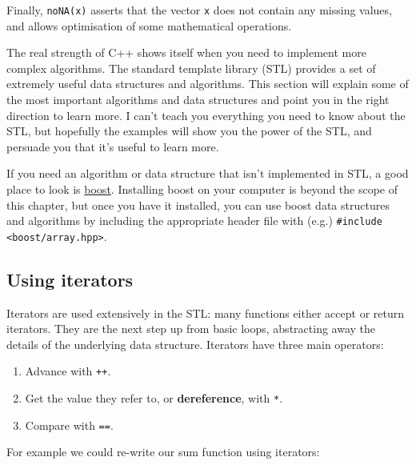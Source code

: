 Finally, \texttt{noNA(x)} asserts that the vector \texttt{x} does not
contain any missing values, and allows optimisation of some mathematical
operations.


The real strength of C++ shows itself when you need to implement more
complex algorithms. The standard template library (STL) provides a set
of extremely useful data structures and algorithms. This section will
explain some of the most important algorithms and data structures and
point you in the right direction to learn more. I can't teach you
everything you need to know about the STL, but hopefully the examples
will show you the power of the STL, and persuade you that it's useful to
learn more. 

If you need an algorithm or data structure that isn't implemented in
STL, a good place to look is \href{http://www.boost.org/doc/}{boost}.
Installing boost on your computer is beyond the scope of this chapter,
but once you have it installed, you can use boost data structures and
algorithms by including the appropriate header file with (e.g.)
\texttt{\#include \textless{}boost/array.hpp\textgreater{}}.

\subsection{Using iterators}

Iterators are used extensively in the STL: many functions either accept
or return iterators. They are the next step up from basic loops,
abstracting away the details of the underlying data structure. Iterators
have three main operators: 

\begin{enumerate}
\def\labelenumi{\arabic{enumi}.}
\itemsep1pt\parskip0pt
\item
  Advance with \texttt{++}.
\item
  Get the value they refer to, or \textbf{dereference}, with \texttt{*}.
\item
  Compare with \texttt{==}.
\end{enumerate}

For example we could re-write our sum function using iterators:

